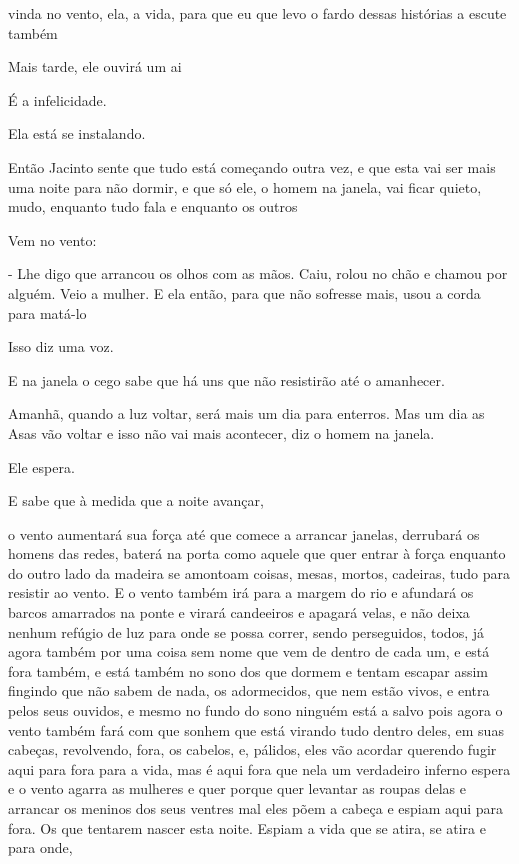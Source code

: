 vinda no vento, ela, a vida, para que eu que levo o fardo dessas
histórias a escute também

Mais tarde, ele ouvirá um ai

É a infelicidade.

Ela está se instalando.

Então Jacinto sente que tudo está começando outra vez, e que esta vai
ser mais uma noite para não dormir, e que só ele, o homem na janela, vai
ficar quieto, mudo, enquanto tudo fala e enquanto os outros

Vem no vento:

- Lhe digo que arrancou os olhos com as mãos. Caiu, rolou no chão e
chamou por alguém. Veio a mulher. E ela então, para que não sofresse
mais, usou a corda para matá-lo

Isso diz uma voz.

E na janela o cego sabe que há uns que não resistirão até o amanhecer.

Amanhã, quando a luz voltar, será mais um dia para enterros. Mas um dia
as Asas vão voltar e isso não vai mais acontecer, diz o homem na janela.

Ele espera.

E sabe que à medida que a noite avançar,

o vento aumentará sua força até que comece a arrancar janelas, derrubará
os homens das redes, baterá na porta como aquele que quer entrar à força
enquanto do outro lado da madeira se amontoam coisas, mesas, mortos,
cadeiras, tudo para resistir ao vento. E o vento também irá para a
margem do rio e afundará os barcos amarrados na ponte e virará
candeeiros e apagará velas, e não deixa nenhum refúgio de luz para onde
se possa correr, sendo perseguidos, todos, já agora também por uma coisa
sem nome que vem de dentro de cada um, e está fora também, e está também
no sono dos que dormem e tentam escapar assim fingindo que não sabem de
nada, os adormecidos, que nem estão vivos, e entra pelos seus ouvidos, e
mesmo no fundo do sono ninguém está a salvo pois agora o vento também
fará com que sonhem que está virando tudo dentro deles, em suas cabeças,
revolvendo, fora, os cabelos, e, pálidos, eles vão acordar querendo
fugir aqui para fora para a vida, mas é aqui fora que nela um verdadeiro
inferno espera e o vento agarra as mulheres e quer porque quer levantar
as roupas delas e arrancar os meninos dos seus ventres mal eles põem a
cabeça e espiam aqui para fora. Os que tentarem nascer esta noite.
Espiam a vida que se atira, se atira e para onde,

